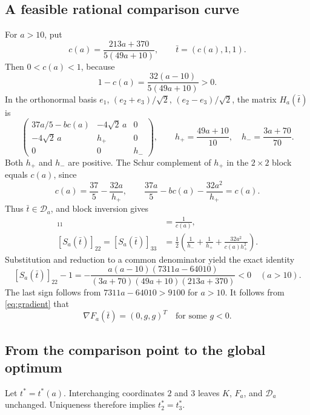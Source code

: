 \documentclass[11pt]{article}
\theoremstyle{remark}\newtheorem{remark}[theorem]{Remark}
\begin{document}
\subsection{A feasible rational comparison curve}
For $a>10$, put
\begin{equation}\label{eq:comparator}
c(a)=\frac{213a+370}{5(49a+10)},\qquad \bar t=(c(a),1,1).
\end{equation}
Then $0<c(a)<1$, because
\[
1-c(a)=\frac{32(a-10)}{5(49a+10)}>0.
\]
In the orthonormal basis $e_1$, $(e_2+e_3)/\sqrt2$, $(e_2-e_3)/\sqrt2$, the matrix $H_a(\bar t)$ is
\begin{equation}\label{eq:block}
\begin{pmatrix}
37a/5-bc(a)&-4\sqrt2\,a&0\\
-4\sqrt2\,a&h_+&0\\
0&0&h_-
\end{pmatrix},\qquad
h_+=\frac{49a+10}{10},\quad h_-=\frac{3a+70}{70}.
\end{equation}
Both $h_+$ and $h_-$ are positive. The Schur complement of $h_+$ in the $2\times2$ block equals $c(a)$, since
\begin{equation}\label{eq:schur}
c(a)=\frac{37}{5}-\frac{32a}{h_+},\qquad
\frac{37a}{5}-bc(a)-\frac{32a^2}{h_+}=c(a).
\end{equation}
Thus $\bar t\in\mathcal D_a$, and block inversion gives
\begin{align}
[S_a(\bar t)]_{11}&=\frac1{c(a)},\label{eq:comparator11}\\
[S_a(\bar t)]_{22}=[S_a(\bar t)]_{33}
&=\frac12\left(\frac1{h_-}+\frac1{h_+}+
\frac{32a^2}{c(a)h_+^2}\right).\label{eq:comparator22}
\end{align}
Substitution and reduction to a common denominator yield the exact identity
\begin{equation}\label{eq:factorization}
\boxed{
[S_a(\bar t)]_{22}-1
=-\frac{a(a-10)(7311a-64010)}
{(3a+70)(49a+10)(213a+370)}<0\quad(a>10).
}
\end{equation}
The last sign follows from $7311a-64010>9100$ for $a>10$. It follows from \eqref{eq:gradient} that
\begin{equation}\label{eq:gradient-sign}
\nabla F_a(\bar t)=(0,g,g)^T\quad\text{for some }g<0.
\end{equation}

\subsection{From the comparison point to the global optimum}
Let $t^*=t^*(a)$. Interchanging coordinates $2$ and $3$ leaves $K$, $F_a$, and $\mathcal D_a$ unchanged. Uniqueness therefore implies $t_2^*=t_3^*$.
\end{document}
